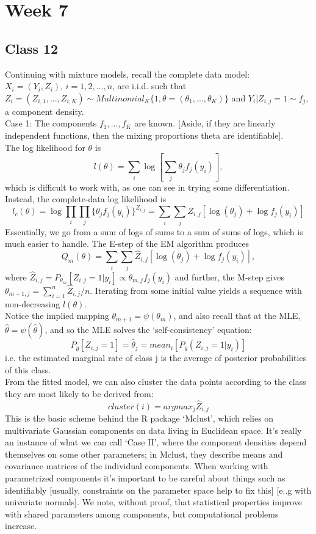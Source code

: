 \documentclass[11pt,a4paper]{article}
\begin{document}
\section*{Week 7}

\subsection*{Class 12}

Continuing with mixture models, recall the complete data model:\\
$X_i = (Y_i, Z_i)$,  $i=1,2,..., n$,  are i.i.d. such that $Z_i = (Z_{i,1}, ..., Z_{i,K} )  \sim Multinomial_K\{ 1,  \theta=(\theta_1, ..., \theta_K ) \}$ and $Y_i | Z_{i,j} = 1\sim f_j$, a component density. \\
Case 1: The components $f_1,...,f_K$ are known.  [Aside, if they are linearly independent functions, then the mixing proportions theta are identifiable].\\
The log likelihood for $\theta$ is
$$l(\theta) = \sum_i   \log\left[   \sum_j  \theta_j  f_j( y_i ) \right], $$
which is difficult to work with, as one can see in trying some differentiation.  Instead, the complete-data log likelihood is
$$l_c(\theta) = \log \prod_i  \prod_j  \{  \theta_j  f_j( y_i ) \}^{ Z_{i,j}}  = \sum_i \sum_j Z_{i,j} [  \log(\theta_j) + \log f_j(y_i) ]$$
Essentially, we go from a sum of logs of sums to a sum of sums of logs, which is much easier to handle.   The E-step of the EM algorithm produces
$$Q_m(\theta) = \sum_i \sum_j  \hat{Z}_{i,j}  [ \log( \theta_j ) + \log f_j(y_i) ],$$
where $\hat{Z}_{i,j} = P_{\theta_m} [ Z_{i,j} = 1 | y_i ] \propto   \theta_{m,j} f_j(y_i)$ and further, the M-step gives  $\theta_{m+1,j} = \sum_{i=1}^n  \hat{Z}_{i,j} / n$.  Iterating from some initial value yields a sequence with non-decreasing  $l(\theta)$.\\
Notice the implied mapping $\theta_{m+1} = \psi ( \theta_m )$, and also recall that at the MLE,   $\hat{\theta} = \psi ( \hat{\theta} )$, and so the MLE solves the `self-consistency' equation:
$$P_{\hat{\theta}} [ Z_{i,j} = 1 ]  = \hat{\theta}_j = mean_i[P_{\hat{\theta}}(Z_{i,j} = 1 | y_i) ]   $$
i.e. the estimated marginal rate of class j is the average of posterior probabilities of this class.\\
From the fitted model, we can also cluster the data points according to the class they are most likely to be derived from:
$$cluster( i ) = argmax_j{\hat{Z}_{i,j} }$$
This is the basic scheme behind the R package `Mclust', which relies on multivariate Gaussian components on data living in Euclidean space.   It's really an instance of what we can call `Case II', where the component densities depend themselves on some other parameters; in Mclust, they describe means and covariance matrices of the individual components.  When working with parametrized components it's important to be careful about things such as identifiably [usually, constraints on the parameter space help to fix this] [e..g with univariate normals].   We note, without proof, that statistical properties improve with shared parameters among components, but computational problems increase.\\
\end{document}
